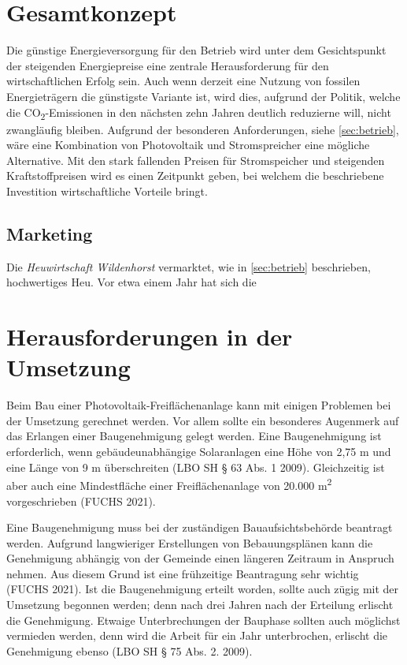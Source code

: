 \documentclass[11pt]{scrartcl}
\begin{document}
\section{Gesamtkonzept}
Die günstige Energieversorgung für den Betrieb wird unter dem Gesichtspunkt der steigenden Energiepreise eine zentrale Herausforderung für den wirtschaftlichen Erfolg sein.
Auch wenn derzeit eine Nutzung von fossilen Energieträgern die günstigste Variante ist, wird dies, aufgrund der Politik, welche die CO\textsubscript{2}-Emissionen in den nächsten zehn Jahren deutlich reduzierne will, nicht zwangläufig bleiben.
Aufgrund der besonderen Anforderungen, siehe \cref{sec:betrieb}, wäre eine Kombination von Photovoltaik und Stromspreicher eine mögliche Alternative.
Mit den stark fallenden Preisen für Stromspeicher  und steigenden Kraftstoffpreisen wird es einen Zeitpunkt geben, bei welchem die beschriebene Investition wirtschaftliche Vorteile bringt.

\subsection{Marketing}
Die \textit{Heuwirtschaft Wildenhorst} vermarktet, wie in \cref{sec:betrieb} beschrieben, hochwertiges Heu.
Vor etwa einem Jahr hat sich die



\section{Herausforderungen in der Umsetzung}
Beim Bau einer Photovoltaik-Freiflächenanlage kann mit einigen Problemen bei der Umsetzung gerechnet werden.
Vor allem sollte ein besonderes Augenmerk auf das Erlangen einer Baugenehmigung gelegt werden.
Eine Baugenehmigung ist erforderlich, wenn gebäudeunabhängige Solaranlagen eine Höhe von 2,75 m und eine Länge von 9 m überschreiten (LBO SH § 63 Abs. 1 2009).
Gleichzeitig ist aber auch eine Mindestfläche einer Freiflächenanlage von 20.000 m\textsuperscript{2} vorgeschrieben (FUCHS 2021).
 
Eine Baugenehmigung muss bei der zuständigen Bauaufsichtsbehörde beantragt werden.
Aufgrund langwieriger Erstellungen von Bebauungsplänen kann die Genehmigung abhängig von der Gemeinde einen längeren Zeitraum in Anspruch nehmen.
Aus diesem Grund ist eine frühzeitige Beantragung sehr wichtig (FUCHS 2021).
Ist die Baugenehmigung erteilt worden, sollte auch zügig mit der Umsetzung begonnen werden; denn nach drei Jahren nach der Erteilung erlischt die Genehmigung.
Etwaige Unterbrechungen der Bauphase sollten auch möglichst vermieden werden, denn wird die Arbeit für ein Jahr unterbrochen, erlischt die Genehmigung ebenso (LBO SH § 75 Abs. 2. 2009).
\end{document}
